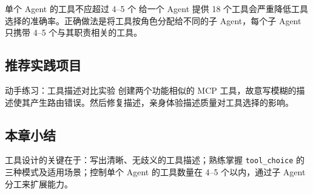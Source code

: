 \begin{warningbox}{单个 Agent 的工具不应超过 4--5 个}
给一个 Agent 提供 18 个工具会严重降低工具选择的准确率。正确做法是将工具按角色分配给不同的子 Agent，每个子 Agent 只携带 4--5 个与其职责相关的工具。
\end{warningbox}

\subsection{推荐实践项目}

\begin{knowledgebox}{动手练习：工具描述对比实验}
创建两个功能相似的 MCP 工具，故意写模糊的描述使其产生路由错误。然后修复描述，亲身体验描述质量对工具选择的影响。
\end{knowledgebox}

\subsection{本章小结}

工具设计的关键在于：写出清晰、无歧义的工具描述；熟练掌握 \texttt{tool\_choice} 的三种模式及适用场景；控制单个 Agent 的工具数量在 4--5 个以内，通过子 Agent 分工来扩展能力。

